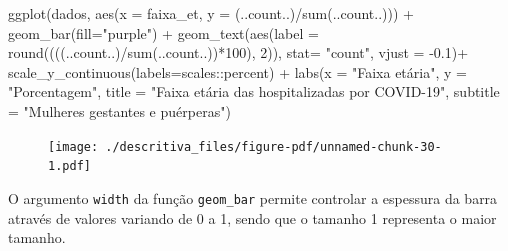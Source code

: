 \documentclass[
  letterpaper,
  DIV=11,
  numbers=noendperiod]{scrreprt}
\newenvironment{Shaded}{\begin{snugshade}}{\end{snugshade}}
\newcommand{\AttributeTok}[1]{\textcolor[rgb]{0.40,0.45,0.13}{#1}}
\newcommand{\DecValTok}[1]{\textcolor[rgb]{0.68,0.00,0.00}{#1}}
\newcommand{\FloatTok}[1]{\textcolor[rgb]{0.68,0.00,0.00}{#1}}
\newcommand{\FunctionTok}[1]{\textcolor[rgb]{0.28,0.35,0.67}{#1}}
\newcommand{\NormalTok}[1]{\textcolor[rgb]{0.00,0.23,0.31}{#1}}
\newcommand{\SpecialCharTok}[1]{\textcolor[rgb]{0.37,0.37,0.37}{#1}}
\newcommand{\StringTok}[1]{\textcolor[rgb]{0.13,0.47,0.30}{#1}}
\begin{document}
\begin{Shaded}
\begin{Highlighting}[]
\FunctionTok{ggplot}\NormalTok{(dados, }\FunctionTok{aes}\NormalTok{(}\AttributeTok{x =}\NormalTok{ faixa\_et, }\AttributeTok{y =}\NormalTok{ (..count..)}\SpecialCharTok{/}\FunctionTok{sum}\NormalTok{(..count..))) }\SpecialCharTok{+}  
  \FunctionTok{geom\_bar}\NormalTok{(}\AttributeTok{fill=}\StringTok{"purple"}\NormalTok{) }\SpecialCharTok{+} 
  \FunctionTok{geom\_text}\NormalTok{(}\FunctionTok{aes}\NormalTok{(}\AttributeTok{label =} \FunctionTok{round}\NormalTok{((((..count..)}\SpecialCharTok{/}\FunctionTok{sum}\NormalTok{(..count..))}\SpecialCharTok{*}\DecValTok{100}\NormalTok{), }\DecValTok{2}\NormalTok{)), }\AttributeTok{stat=} \StringTok{"count"}\NormalTok{, }\AttributeTok{vjust =} \SpecialCharTok{{-}}\FloatTok{0.1}\NormalTok{)}\SpecialCharTok{+}
  \FunctionTok{scale\_y\_continuous}\NormalTok{(}\AttributeTok{labels=}\NormalTok{scales}\SpecialCharTok{::}\NormalTok{percent) }\SpecialCharTok{+}
  \FunctionTok{labs}\NormalTok{(}\AttributeTok{x =} \StringTok{"Faixa etária"}\NormalTok{, }\AttributeTok{y =} \StringTok{"Porcentagem"}\NormalTok{, }\AttributeTok{title =} \StringTok{"Faixa etária das hospitalizadas por COVID{-}19"}\NormalTok{, }\AttributeTok{subtitle =} \StringTok{"Mulheres gestantes e puérperas"}\NormalTok{)}
\end{Highlighting}
\end{Shaded}

\begin{figure}[H]

{\centering \texttt{[image: ./descritiva\_files/figure-pdf/unnamed-chunk-30-1.pdf]}

}

\end{figure}

O argumento \texttt{width} da função \texttt{geom\_bar} permite
controlar a espessura da barra através de valores variando de 0 a 1,
sendo que o tamanho 1 representa o maior tamanho.
\end{document}
